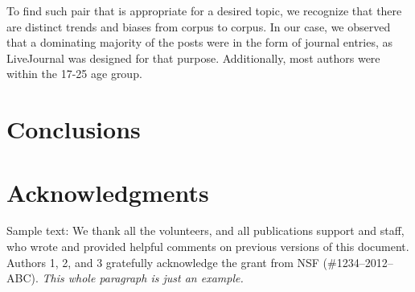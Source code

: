 \documentclass{sigchi}
\begin{document}
To find such pair that is appropriate for a desired topic, we recognize that there are distinct trends and biases from corpus to corpus. In our case, we observed that a dominating majority of the posts were in the form of journal entries, as LiveJournal was designed for that purpose. Additionally, most authors were within the 17-25 age group.


\section{Conclusions}


\section{Acknowledgments}

Sample text: We thank all the volunteers, and all publications support
and staff, who wrote and provided helpful comments on previous
versions of this document. Authors 1, 2, and 3 gratefully acknowledge
the grant from NSF (\#1234--2012--ABC). \textit{This whole paragraph is
  just an example.}




\end{document}
